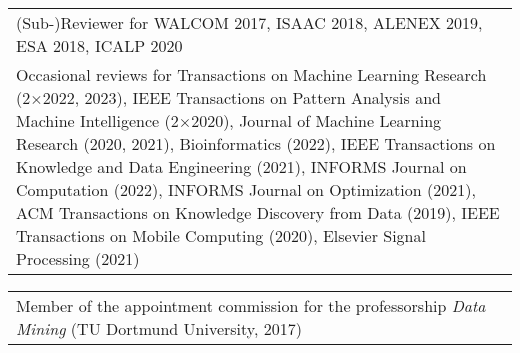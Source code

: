 \documentclass[10pt, a4paper, DIV=14, headings=small]{scrartcl}
\begin{document}
\begin{tabular}{p{14.5cm}}
	(Sub-)Reviewer for WALCOM 2017, ISAAC 2018, ALENEX 2019, ESA 2018, ICALP 2020                                                                                                                                                                                                                                                                                                                                                                                                                                                                                                                                                                                                                                                                                                                                                                                                                 \\[0.5em]

	Occasional reviews for Transactions on Machine Learning Research (2$\times$2022, 2023), IEEE Transactions on Pattern Analysis and Machine Intelligence (2$\times$2020), Journal of Machine Learning Research (2020, 2021), Bioinformatics (2022), IEEE Transactions on Knowledge and Data Engineering (2021), INFORMS Journal on Computation (2022), INFORMS Journal on Optimization (2021), ACM Transactions on Knowledge Discovery from Data (2019), IEEE Transactions on Mobile Computing (2020), Elsevier Signal Processing (2021)                                                                                                                                                                                                                                                                                                                                                                         \\
\end{tabular}

\begin{tabular}{p{14.5cm}}
	Member of the appointment commission for the professorship \emph{Data Mining} (TU Dortmund University, 2017)
\end{tabular}
\end{document}
